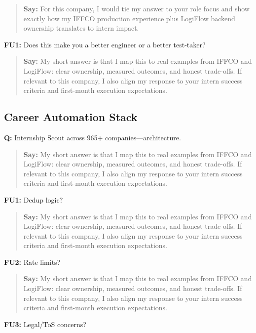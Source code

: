 \documentclass[9pt,a4paper]{article}
\begin{document}
\begin{quote}\small\textbf{Say:} For this company, I would tie my answer to your role focus and show exactly how my IFFCO production experience plus LogiFlow backend ownership translates to intern impact.\end{quote}
\vspace{2mm}
\textbf{FU1:} Does this make you a better engineer or a better test-taker?

\begin{quote}\small\textbf{Say:} My short answer is that I map this to real examples from IFFCO and LogiFlow: clear ownership, measured outcomes, and honest trade-offs. If relevant to this company, I also align my response to your intern success criteria and first-month execution expectations.\end{quote}
\vspace{2mm}
\subsection{Career Automation Stack}
\textbf{Q:} Internship Scout across 965+ companies---architecture.

\begin{quote}\small\textbf{Say:} My short answer is that I map this to real examples from IFFCO and LogiFlow: clear ownership, measured outcomes, and honest trade-offs. If relevant to this company, I also align my response to your intern success criteria and first-month execution expectations.\end{quote}
\vspace{2mm}
\textbf{FU1:} Dedup logic?

\begin{quote}\small\textbf{Say:} My short answer is that I map this to real examples from IFFCO and LogiFlow: clear ownership, measured outcomes, and honest trade-offs. If relevant to this company, I also align my response to your intern success criteria and first-month execution expectations.\end{quote}
\vspace{2mm}
\textbf{FU2:} Rate limits?

\begin{quote}\small\textbf{Say:} My short answer is that I map this to real examples from IFFCO and LogiFlow: clear ownership, measured outcomes, and honest trade-offs. If relevant to this company, I also align my response to your intern success criteria and first-month execution expectations.\end{quote}
\vspace{2mm}
\textbf{FU3:} Legal/ToS concerns?
\end{document}
